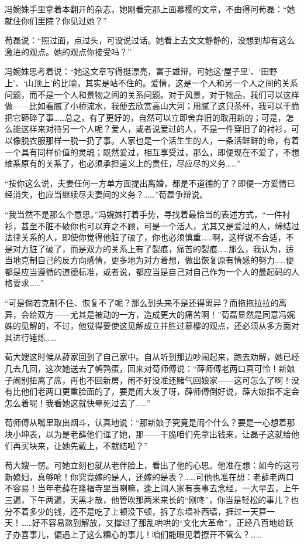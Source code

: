 \par 冯婉姝手里拿着本翻开的杂志，她刚看完那上面慕樱的文章，不由得问荀磊：“她就住你们里院？你见过她？”
\par 荀磊说：“照过面，点过头，可没说过话。她看上去文文静静的，没想到却有这么激进的观点。她的观点你接受吗？”
\par 冯婉姝思考着说：“她这文章写得挺漂亮，富于雄辩。可她这‘屋子里’、‘田野上’、‘山顶上’的比喻，其实是站不住的。爱情，这是一个人和另一个人之间的关系问题，而不是一个人和景物之间的关系问题。对于风景，对于物品，我们可以这样做——比如看腻了小桥流水，我便去欣赏高山大河；用腻了这只茶杯，我可以干脆把它砸碎了事……总之，有了更好的，自然可以立即舍弃旧的取用新的；可是，怎么能这样来对待另一个人呢？爱人，或者说爱过的人，不是一件穿旧了的衬衫，可以像脱衣服那样一脱一扔了事。人家也是一个活生生的人，一条活鲜鲜的命，有着一个具有同样价值的灵魂；既然爱过，相互享受过，那么，即便现在不爱了，不想维系原有的关系了，也必须承担道义上的责任，尽应尽的义务……”
\par “按你这么说，夫妻任何一方单方面提出离婚，都是不道德的了？即便一方爱情已经消失，也应当继续尽夫妻间的义务？……”荀磊争辩说。
\par “我当然不是那么个意思。”冯婉姝打着手势，寻找着最恰当的表述方式，“一件衬衫，甚至不脏不破你也可以弃之不顾，可是一个活人，尤其又是爱过的人，缔结过法律关系的人，即使你觉得他脏了破了，你也必须慎重……啊，这样说不合适，不是对方脏了破了，而是双方的关系上有了裂痕，痛苦的裂痕……那么，我认为，适当地克制自己的反方向感情，更多地为对方着想，做出恢复原有情感的努力……便都是应当遵循的道德标准，或者说，都应当是自己对自己作为一个人的最起码的人格要求……”
\par “可是倘若克制不住、恢复不了呢？那么到头来不是还得离异？而拖拖拉拉的离异，会给双方——尤其是被动的一方，造成更大的痛苦啊！”荀磊显然是同意冯婉姝的见解的，不过，他觉得要使这见解成立并胜过慕樱的观点，还必须从多方面对其进行锤炼……
\par 荀大嫂这时候从薛家回到了自己家中。自从听到那边吵闹起来，跑去劝解，她已经几去几回，这次她送去了鹌鹑蛋，回来对荀师傅说：“薛师傅老两口真可怜！新娘子闹别扭离了席，再也不回新房，闹不好没准还赌气回娘家——这可怎么了啊！没有比他们老两口更重脸面的了，要是闹大发了呀，薛师傅倒好说，薛大娘指不定会怎么着呢！我看她这就快晕死过去了……”
\par 荀师傅从嘴里取出烟斗，认真地说：“那新娘子究竟是闹个什么？要是一心想着那块小坤表，以为是老薛他们诓了她，那——干脆咱们先拿出钱来，让磊子这就给他们再买块来，让她先戴上，不就结啦？”
\par 荀大嫂一愣。可她立刻也就从老伴脸上，看出了他的心思。他准在想：如今的这号新媳妇，真够呛！你究竟嫁的是人，还嫁的是表？……可他也准在想：老薛老两口不容易！当年老薛在隆福寺里当喇嘛，逢上阔人家有丧事去念经，一大早去，上午三遍，下午两遍，天黑才散，他管吹那两米来长的“刚咚”，你当是轻松的事儿？也分不着多少的钱，还不是吃了上顿没下顿，拆了东墙补西墙，捱过一天算一天！……好不容易熬到解放，又撑过了那乱哄哄的“文化大革命”，正经八百地给跃子办喜事儿，偏遇上了这么糟心的事儿！咱们能眼见着撩开不管么？……
